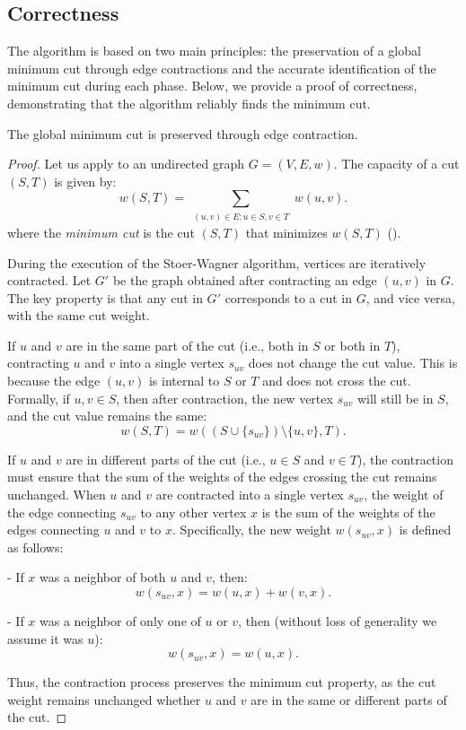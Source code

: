 \subsection{Correctness}
The algorithm is based on two main principles: the preservation of a global minimum cut through edge contractions and the accurate identification of the minimum cut during each phase. Below, we provide a proof of correctness, demonstrating that the algorithm reliably finds the minimum cut.

\begin{theorem}
    The global minimum cut is preserved through edge contraction.
\end{theorem}

\begin{proof}
    
    Let us apply  to an undirected graph \( G = (V, E, w) \). The capacity of a cut \((S, T)\) is given by:
    \[
    w(S, T) = \sum_{\substack{(u,v) \in E: u \in S, v \in T}} w(u, v).
    \]
    where the \emph{minimum cut} is the cut \((S, T)\) that minimizes \( w(S, T) \) ().
    
    During the execution of the Stoer-Wagner algorithm, vertices are iteratively contracted. Let \( G' \) be the graph obtained after contracting an edge \((u, v)\) in \( G \). The key property is that any cut in \( G' \) corresponds to a cut in \( G \), and vice versa, with the same cut weight.
    
    If \( u \) and \( v \) are in the same part of the cut (i.e., both in \( S \) or both in \( T \)), contracting \( u \) and \( v \) into a single vertex \( s_{uv} \) does not change the cut value. This is because the edge \((u, v)\) is internal to \( S \) or \( T \) and does not cross the cut. Formally, if \( u, v \in S \), then after contraction, the new vertex \( s_{uv} \) will still be in \( S \), and the cut value remains the same:
    \[
    w(S, T) = w((S \cup \{s_{uv}\}) \setminus \{u, v\}, T).
    \]
    
    If \( u \) and \( v \) are in different parts of the cut (i.e., \( u \in S \) and \( v \in T \)), the contraction must ensure that the sum of the weights of the edges crossing the cut remains unchanged. When \( u \) and \( v \) are contracted into a single vertex \( s_{uv} \), the weight of the edge connecting \( s_{uv} \) to any other vertex \( x \) is the sum of the weights of the edges connecting \( u \) and \( v \) to \( x \). Specifically, the new weight \( w(s_{uv}, x) \) is defined as follows:
    
    - If \( x \) was a neighbor of both \( u \) and \( v \), then:
    \[
    w(s_{uv}, x) = w(u, x) + w(v, x).
    \]
    
    - If \( x \) was a neighbor of only one of \( u \) or \( v \), then (without loss of generality we assume it was \(u\)):
    \[
    w(s_{uv}, x) = w(u, x).
    \]
    
    Thus, the contraction process preserves the minimum cut property, as the cut weight remains unchanged whether \( u \) and \( v \) are in the same or different parts of the cut.
\end{proof}


